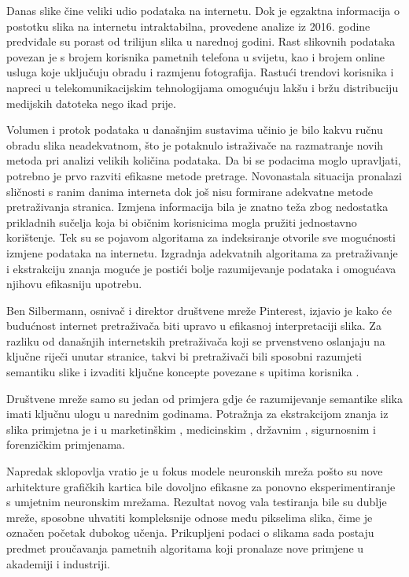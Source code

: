 \documentclass[times, utf8, proizvoljni, numeric]{fer}
\begin{document}
Danas slike čine veliki udio podataka na internetu. Dok je egzaktna informacija o postotku slika na internetu intraktabilna, provedene analize iz 2016. godine \cite{img-analysis} predviđale su porast od trilijun slika u narednoj godini. Rast slikovnih podataka povezan je s brojem korisnika pametnih telefona u svijetu, kao i brojem online usluga koje uključuju obradu i razmjenu fotografija. Rastući trendovi korisnika \cite{net-users} i napreci u telekomunikacijskim tehnologijama omogućuju lakšu i bržu distribuciju medijskih datoteka nego ikad prije. 

Volumen i protok podataka u današnjim sustavima učinio je bilo kakvu ručnu obradu slika neadekvatnom, što je potaknulo istraživače na razmatranje novih metoda pri analizi velikih količina podataka. Da bi se podacima moglo upravljati, potrebno je prvo razviti efikasne metode pretrage. Novonastala situacija pronalazi sličnosti s ranim danima interneta dok još nisu formirane adekvatne metode pretraživanja stranica. Izmjena informacija bila je znatno teža zbog nedostatka prikladnih sučelja koja bi običnim korisnicima mogla pružiti jednostavno korištenje. Tek su se pojavom algoritama za indeksiranje otvorile sve mogućnosti izmjene podataka na internetu. Izgradnja adekvatnih algoritama za pretraživanje i ekstrakciju znanja moguće je postići bolje razumijevanje podataka i omogućava njihovu efikasniju upotrebu. 

Ben Silbermann, osnivač i direktor društvene mreže Pinterest, izjavio je kako će budućnost internet pretraživača biti upravo u efikasnoj interpretaciji slika. Za razliku od današnjih internetskih pretraživača koji se prvenstveno oslanjaju na ključne riječi unutar stranice, takvi bi pretraživači bili sposobni razumjeti semantiku slike i izvaditi ključne koncepte povezane s upitima korisnika \cite{internet-trends}.

Društvene mreže samo su jedan od primjera gdje će razumijevanje semantike slika imati ključnu ulogu u narednim godinama. Potražnja za ekstrakcijom znanja iz slika primjetna je i u marketinškim \cite{electronic-commerce-application}, medicinskim \cite{medical-application} \cite{medical-diagnostics-application}, državnim \cite{smart-city-application}, sigurnosnim \cite{security-application} i forenzičkim \cite{forensics-application} primjenama. 

Napredak sklopovlja vratio je u fokus modele neuronskih mreža pošto su nove arhitekture grafičkih kartica bile dovoljno efikasne za ponovno eksperimentiranje s umjetnim neuronskim mrežama. Rezultat novog vala testiranja bile su dublje mreže, sposobne uhvatiti kompleksnije odnose među pikselima slika, čime je označen početak dubokog učenja. Prikupljeni podaci o slikama sada postaju predmet proučavanja pametnih algoritama koji pronalaze nove primjene u akademiji i industriji. 
\end{document}

